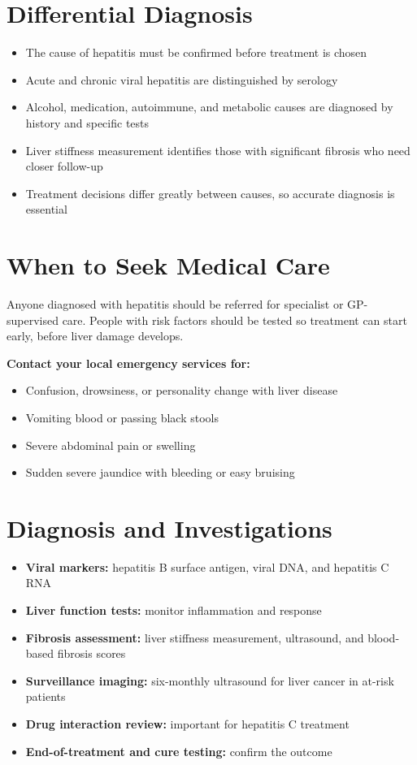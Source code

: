 \section*{Differential Diagnosis}
\begin{itemize}
    \item The cause of hepatitis must be confirmed before treatment is chosen
    \item Acute and chronic viral hepatitis are distinguished by serology
    \item Alcohol, medication, autoimmune, and metabolic causes are diagnosed by history and specific tests
    \item Liver stiffness measurement identifies those with significant fibrosis who need closer follow-up
    \item Treatment decisions differ greatly between causes, so accurate diagnosis is essential
\end{itemize}

\section*{When to Seek Medical Care}
Anyone diagnosed with hepatitis should be referred for specialist or GP-supervised care. People with risk factors should be tested so treatment can start early, before liver damage develops.

\textbf{Contact your local emergency services for:}
\begin{itemize}
    \item Confusion, drowsiness, or personality change with liver disease
    \item Vomiting blood or passing black stools
    \item Severe abdominal pain or swelling
    \item Sudden severe jaundice with bleeding or easy bruising
\end{itemize}

\section*{Diagnosis and Investigations}
\begin{itemize}
    \item \textbf{Viral markers:} hepatitis B surface antigen, viral DNA, and hepatitis C RNA
    \item \textbf{Liver function tests:} monitor inflammation and response
    \item \textbf{Fibrosis assessment:} liver stiffness measurement, ultrasound, and blood-based fibrosis scores
    \item \textbf{Surveillance imaging:} six-monthly ultrasound for liver cancer in at-risk patients
    \item \textbf{Drug interaction review:} important for hepatitis C treatment
    \item \textbf{End-of-treatment and cure testing:} confirm the outcome
\end{itemize}

